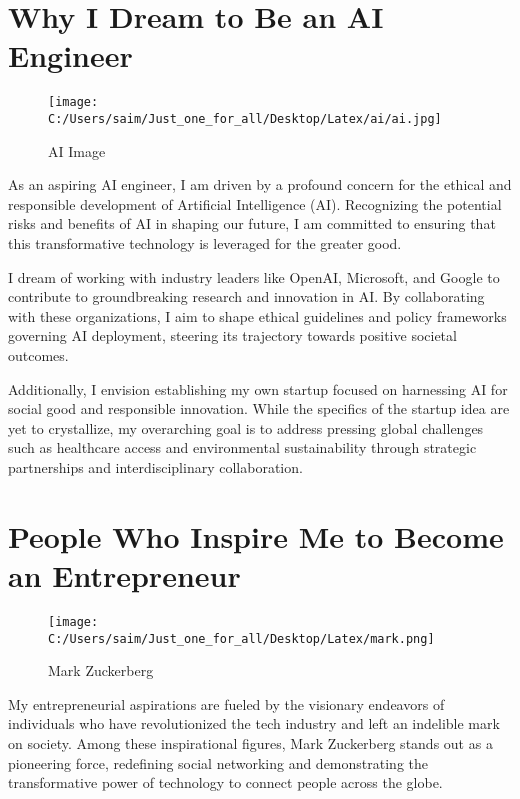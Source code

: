 \documentclass[12pt,a4paper]{article}
\begin{document}
\section{Why I Dream to Be an AI Engineer}

\begin{wrapfigure}{r}{0.3\textwidth}
    \centering
    \texttt{[image: C:/Users/saim/Just\_one\_for\_all/Desktop/Latex/ai/ai.jpg]}
    \caption{AI Image}
    \label{fig:ai_image}
\end{wrapfigure}

As an aspiring AI engineer, I am driven by a profound concern for the ethical and responsible development of Artificial Intelligence (AI). Recognizing the potential risks and benefits of AI in shaping our future, I am committed to ensuring that this transformative technology is leveraged for the greater good.

I dream of working with industry leaders like OpenAI, Microsoft, and Google to contribute to groundbreaking research and innovation in AI. By collaborating with these organizations, I aim to shape ethical guidelines and policy frameworks governing AI deployment, steering its trajectory towards positive societal outcomes.

Additionally, I envision establishing my own startup focused on harnessing AI for social good and responsible innovation. While the specifics of the startup idea are yet to crystallize, my overarching goal is to address pressing global challenges such as healthcare access and environmental sustainability through strategic partnerships and interdisciplinary collaboration.

\section{People Who Inspire Me to Become an Entrepreneur}

\begin{wrapfigure}{r}{0.3\textwidth}
    \centering
    \texttt{[image: C:/Users/saim/Just\_one\_for\_all/Desktop/Latex/mark.png]}
    \caption{Mark Zuckerberg}
    \label{fig:mark_zuckerberg}
\end{wrapfigure}

My entrepreneurial aspirations are fueled by the visionary endeavors of individuals who have revolutionized the tech industry and left an indelible mark on society. Among these inspirational figures, Mark Zuckerberg stands out as a pioneering force, redefining social networking and demonstrating the transformative power of technology to connect people across the globe.
\end{document}
